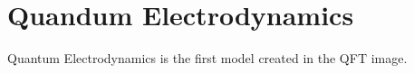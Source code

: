 \section{Quandum Electrodynamics} \label{sec:theory:qed}

Quantum Electrodynamics is the first model created in the QFT image.
